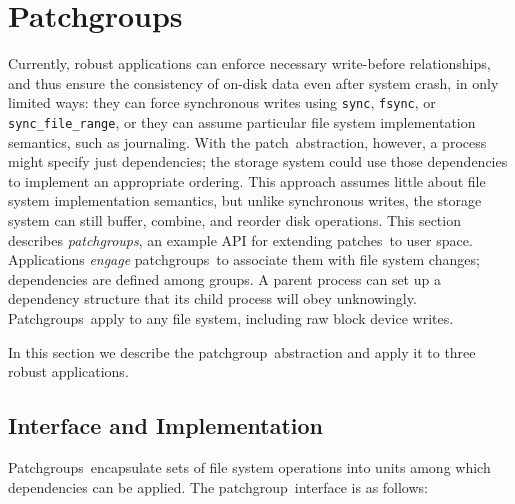 \documentclass[9pt,twocolumn,letterpaper]{article}
\newcommand{\patch}{patch}
\newcommand{\patches}{patches}
\newcommand{\patchgroup}{patchgroup}
\newcommand{\patchgroups}{patchgroups}
\newcommand{\Patchgroups}{Patchgroups}
\begin{document}
\section{\Patchgroups}
\label{sec:patchgroup}



Currently,
robust applications
%
can enforce necessary write-before relationships, and thus ensure the
consistency of on-disk data even after system crash, in only limited
ways:
%
they can force synchronous writes using
\texttt{sync}, \texttt{fsync}, or \texttt{sync\_file\_range}, or
%
they can assume particular file system implementation
semantics, such as journaling.
%
With the \patch\ abstraction, however, a process might specify
just dependencies; the storage system could use those dependencies to implement
an appropriate ordering.
%
This approach assumes little about file system implementation semantics,
but unlike synchronous writes, the storage system can still
buffer, combine, and reorder disk operations.
%
This section describes \emph{\patchgroups}, an example API for extending
\patches\ to user space.
%
Applications \emph{engage} \patchgroups\ to associate them with file system
changes; dependencies are
defined among groups.  A parent process can set up a dependency structure
that its child process will obey unknowingly.  \Patchgroups\ apply to
any file system, including raw block device writes.  

In this section we describe the \patchgroup\ abstraction
%
and apply it to three robust applications.


\subsection{Interface and Implementation}
\label{sec:patchgroup:interface}

\Patchgroups\ encapsulate sets of file system operations into units among
which dependencies can be applied.
%
%
The \patchgroup\ interface is as follows:
\end{document}
